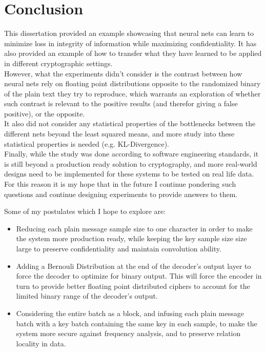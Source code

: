 \documentclass[a4paper, 12pt]{report}
\begin{document}
\chapter{Conclusion}\label{sec:conclusion}
\begin{center}
	\begin{minipage}{0.8\textwidth}
		\justify
		This dissertation provided an example showcasing that neural nets can learn to minimize loss in integrity of information while maximizing confidentiality. It has also provided an example of how to transfer what they have learned to be applied in different cryptographic settings.\\
		However, what the experiments didn't consider is the contrast between how neural nets rely on floating point distributions opposite to the randomized binary of the plain text they try to reproduce, which warrants an exploration of whether such contrast is relevant to the positive results (and therefor giving a false positive), or the opposite.\\
		It also did not consider any statistical properties of the bottlenecks between the different nets beyond the least squared means, and more study into these statistical properties is needed (e.g. KL-Divergence).\\
		Finally, while the study was done according to software engineering standards, it is still beyond a production ready solution to cryptography, and more real-world designs need to be implemented for these systems to be tested on real life data.\\
		For this reason it is my hope that in the future I continue pondering such questions and continue designing experiments to provide answers to them.\\
	\end{minipage}
\end{center}
Some of my postulates which I hope to explore are:
\begin{itemize}
	\item Reducing each plain message sample size to one character in order to make the system more production ready, while keeping the key sample size size large to preserve confidentiality and maintain convolution ability.
	\item Adding a Bernouli Distribution at the end of the decoder's output layer to force the decoder to optimize for binary output. This will force the encoder in turn to provide better floating point distributed ciphers to account for the limited binary range of the decoder's output.
	\item Considering the entire batch as a block, and infusing each plain message batch with a key batch containing the same key in each sample, to make the system more secure against frequency analysis, and to preserve relation locality in data.
\end{itemize}
\end{document}
